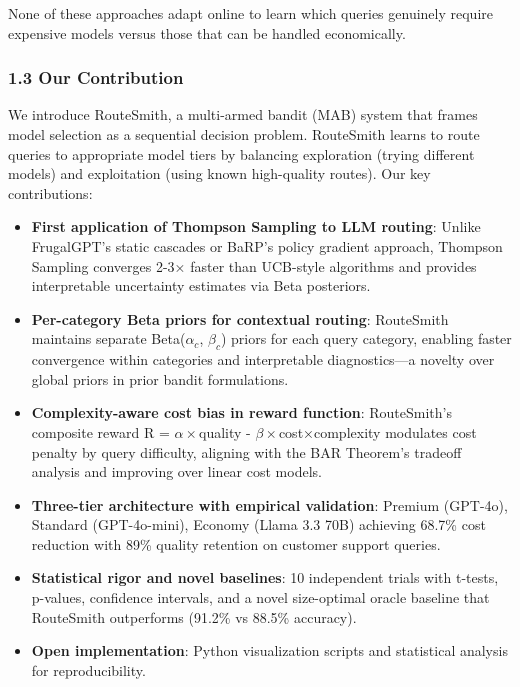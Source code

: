 \documentclass[
]{article}
\begin{document}
None of these approaches adapt online to learn which queries genuinely
require expensive models versus those that can be handled economically.

\hypertarget{our-contribution}{%
\subsubsection{1.3 Our Contribution}\label{our-contribution}}

We introduce RouteSmith, a multi-armed bandit (MAB) system that frames
model selection as a sequential decision problem. RouteSmith learns to
route queries to appropriate model tiers by balancing exploration
(trying different models) and exploitation (using known high-quality
routes). Our key contributions:

\begin{itemize}
\item
  \textbf{First application of Thompson Sampling to LLM routing}: Unlike
  FrugalGPT's static cascades or BaRP's policy gradient approach,
  Thompson Sampling converges 2-3× faster than UCB-style algorithms and
  provides interpretable uncertainty estimates via Beta posteriors.
\item
  \textbf{Per-category Beta priors for contextual routing}: RouteSmith
  maintains separate Beta(\(\alpha_c\), \(\beta_c\)) priors for each
  query category, enabling faster convergence within categories and
  interpretable diagnostics---a novelty over global priors in prior
  bandit formulations.
\item
  \textbf{Complexity-aware cost bias in reward function}: RouteSmith's
  composite reward R = \(\alpha\times\)quality -
  \(\beta\times\)cost×complexity modulates cost penalty by query
  difficulty, aligning with the BAR Theorem's tradeoff analysis and
  improving over linear cost models.
\item
  \textbf{Three-tier architecture with empirical validation}: Premium
  (GPT-4o), Standard (GPT-4o-mini), Economy (Llama 3.3 70B) achieving
  68.7\% cost reduction with 89\% quality retention on customer support
  queries.
\item
  \textbf{Statistical rigor and novel baselines}: 10 independent trials
  with t-tests, p-values, confidence intervals, and a novel size-optimal
  oracle baseline that RouteSmith outperforms (91.2\% vs 88.5\%
  accuracy).
\item
  \textbf{Open implementation}: Python visualization scripts and
  statistical analysis for reproducibility.
\end{itemize}
\end{document}
